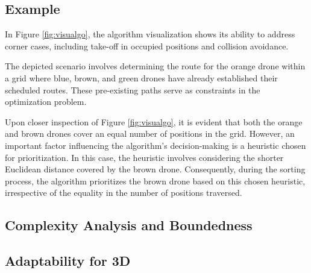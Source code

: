 


\subsection{Example} \label{ssec:example}



In Figure \ref{fig:visualgo}, the algorithm visualization shows its ability to address corner cases, including take-off in occupied positions and collision avoidance.

The depicted scenario involves determining the route for the orange drone within a grid where blue, brown, and green drones have already established their scheduled routes. These pre-existing paths serve as constraints in the optimization problem.

Upon closer inspection of Figure \ref{fig:visualgo}, it is evident that both the orange and brown drones cover an equal number of positions in the grid. However, an important factor influencing the algorithm's decision-making is a heuristic chosen for prioritization. In this case, the heuristic involves considering the shorter Euclidean distance covered by the brown drone. Consequently, during the sorting process, the algorithm prioritizes the brown drone based on this chosen heuristic, irrespective of the equality in the number of positions traversed.



\subsection{Complexity Analysis and Boundedness}
\label{secc:complexity_analysis}




\subsection{Adaptability for 3D}


